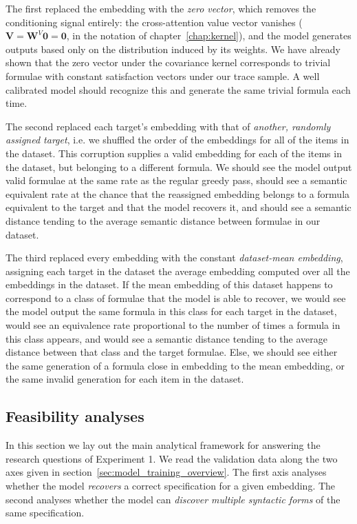 \documentclass[titlepage,a4paper,11pt]{report}
\begin{document}
    The first replaced the embedding with the \emph{zero vector}, which removes the conditioning signal entirely: the cross-attention value vector vanishes ($\bm V = \bm W^V \bm 0 = \bm 0$, in the notation of chapter~\ref{chap:kernel}), and the model generates outputs based only on the distribution induced by its weights. We have already shown that the zero vector under the covariance kernel corresponds to trivial formulae with constant satisfaction vectors under our trace sample. A well calibrated model should recognize this and generate the same trivial formula each time.
    
    The second replaced each target's embedding with that of \emph{another, randomly assigned target}, i.e. we shuffled the order of the embeddings for all of the items in the dataset. This corruption supplies a valid embedding for each of the items in the dataset, but belonging to a different formula. We should see the model output valid formulae at the same rate as the regular greedy pass, should see a semantic equivalent rate at the chance that the reassigned embedding belongs to a formula equivalent to the target and that the model recovers it, and should see a semantic distance tending to the average semantic distance between formulae in our dataset. 
    
    The third replaced every embedding with the constant \emph{dataset-mean embedding}, assigning each target in the dataset the average embedding computed over all the embeddings in the dataset. If the mean embedding of this dataset happens to correspond to a class of formulae that the model is able to recover, we would see the model output the same formula in this class for each target in the dataset, would see an equivalence rate proportional to the number of times a formula in this class appears, and would see a semantic distance tending to the average distance between that class and the target formulae. Else, we should see either the same generation of a formula close in embedding to the mean embedding, or the same invalid generation for each item in the dataset.

    
    \subsection{Feasibility analyses}\label{sec:exp1_analyses}
    In this section we lay out the main analytical framework for answering the research questions of Experiment 1. We read the validation data along the two axes given in section~\ref{sec:model_training_overview}. The first axis analyses whether the model \emph{recovers} a correct specification for a given embedding. The second analyses whether the model can \emph{discover multiple syntactic forms} of the same specification. 
    
\end{document}
